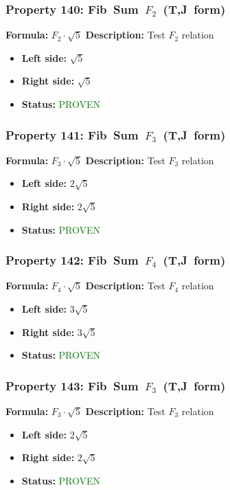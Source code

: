 \subsubsection*{Property 140: Fib~Sum~$F_{2}$~(T,J~form)}
\textbf{Formula:} $F_2 \cdot \sqrt{5}$
\textbf{Description:} Test $F_{2}$ relation

\begin{itemize}
\item \textbf{Left side:} $\sqrt{5}$
\item \textbf{Right side:} $\sqrt{5}$
\item \textbf{Status:} \textcolor{green}{PROVEN}
\end{itemize}

\subsubsection*{Property 141: Fib~Sum~$F_{3}$~(T,J~form)}
\textbf{Formula:} $F_3 \cdot \sqrt{5}$
\textbf{Description:} Test $F_{3}$ relation

\begin{itemize}
\item \textbf{Left side:} $2 \sqrt{5}$
\item \textbf{Right side:} $2 \sqrt{5}$
\item \textbf{Status:} \textcolor{green}{PROVEN}
\end{itemize}

\subsubsection*{Property 142: Fib~Sum~$F_{4}$~(T,J~form)}
\textbf{Formula:} $F_4 \cdot \sqrt{5}$
\textbf{Description:} Test $F_{4}$ relation

\begin{itemize}
\item \textbf{Left side:} $3 \sqrt{5}$
\item \textbf{Right side:} $3 \sqrt{5}$
\item \textbf{Status:} \textcolor{green}{PROVEN}
\end{itemize}

\subsubsection*{Property 143: Fib~Sum~$F_{3}$~(T,J~form)}
\textbf{Formula:} $F_3 \cdot \sqrt{5}$
\textbf{Description:} Test $F_{3}$ relation

\begin{itemize}
\item \textbf{Left side:} $2 \sqrt{5}$
\item \textbf{Right side:} $2 \sqrt{5}$
\item \textbf{Status:} \textcolor{green}{PROVEN}
\end{itemize}

